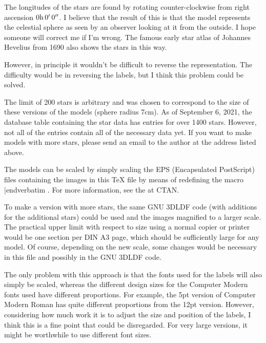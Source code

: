 The longitudes of the stars are found by rotating counter-clockwise
from right ascension $0\rm{h}\thinspace 0^\prime\thinspace 0^{\prime\prime}$.
I believe that the result of this is that the model represents the celestial sphere
as seen by an observer looking at it from the outside. I hope someone will correct me
if I'm wrong. The famous early star atlas of Johannes Hevelius from 1690 also shows the stars
in this way.

However, in principle it wouldn't be difficult to reverse the representation. The difficulty would be
in reversing the labels, but I think this problem could be solved.

The limit of 200 stars is arbitrary and was chosen to correspond to the size of these versions of
the models (sphere radius 7cm).  As of September 6, 2021, the database table containing the star data has
entries for over 1400 stars.  However, not all of the entries contain all of the necessary data yet.
If you want to make models with more stars, please send an email to the author at the address listed above.

The models can be scaled by simply scaling the EPS (Encapsulated PostScript)
files containing the images in this {\TeX} file by means of redefining the macro
\verbatim \epsfsize|endverbatim .  For more information, see the
\href{https://ftp.rrzn.uni-hannover.de/pub/mirror/tex-archive/macros/generic/epsf/epsf-doc.pdf}{}
at CTAN.

To make a version with more stars, the same GNU 3DLDF code (with additions for the additional stars)
could be used and the images magnified to a larger scale.
The practical upper limit with respect to size using a normal copier or printer would be one section
per DIN A3 page, which should be sufficiently large for any model.  Of course, depending on the new scale,
some changes would be necessary in this file and possibly in the GNU 3DLDF code.

The only problem with this approach is that the fonts used for the
labels will also simply be scaled, whereas the different design sizes
for the Computer Modern fonts used have different proportions. For example,
the 5pt version of Computer Modern Roman has quite different proportions from the 12pt version.
However, considering how much work it is to adjust the size and position of the labels, I think this
is a fine point that could be disregarded. For very large versions, it might be worthwhile to use
different font sizes.
\vfil\eject
\endgroup

